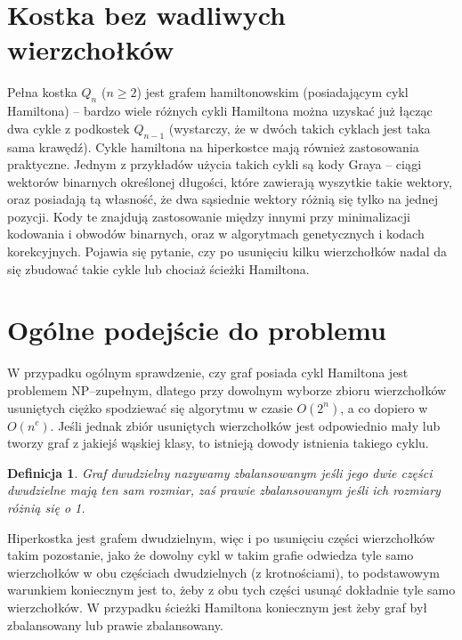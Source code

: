 \documentclass{pracamgr}
\newtheorem{defi}{Definicja}[section] %
\begin{document}
  \section{Kostka bez wadliwych wierzchołków}
   Pełna kostka $Q_n$ ($n\ge2$) jest grafem hamiltonowskim (posiadającym cykl Hamiltona)
   -- bardzo wiele różnych cykli Hamiltona można uzyskać już łącząc dwa cykle
   z podkostek $Q_{n-1}$ (wystarczy, że w dwóch takich cyklach jest taka sama krawędź).
   Cykle hamiltona na hiperkostce mają również zastosowania praktyczne. Jednym z przykładów użycia takich cykli są kody Graya
   -- ciągi wektorów binarnych określonej długości, które zawierają wyszytkie takie wektory, oraz posiadają tą własność,
   że dwa sąsiednie wektory różnią się tylko na jednej pozycji. Kody te znajdują zastosowanie między innymi przy minimalizacji kodowania i obwodów binarnych,
   oraz w algorytmach genetycznych i kodach korekcyjnych.\newline
   Pojawia się pytanie, czy po usunięciu kilku wierzchołków nadal da się zbudować takie cykle lub chociaż ścieżki Hamiltona.
  \section{Ogólne podejście do problemu}
   W przypadku ogólnym sprawdzenie, czy graf posiada cykl Hamiltona jest problemem NP--zupełnym, dlatego przy dowolnym wyborze zbioru wierzchołków usuniętych
   ciężko spodziewać się algorytmu w czasie $O(2^n)$, a co dopiero w $O(n^c)$. Jeśli jednak zbiór usuniętych wierzchołków
   jest odpowiednio mały lub tworzy graf z jakiejś wąskiej klasy, to istnieją dowody istnienia takiego cyklu.
   
   \begin{defi}\label{graf zbalansowany}
    Graf dwudzielny nazywamy \emph{zbalansowanym} jeśli jego dwie części dwudzielne mają ten sam rozmiar,
    zaś \emph{prawie zbalansowanym} jeśli ich rozmiary różnią się o 1.
   \end{defi}    
   
   Hiperkostka jest grafem dwudzielnym, więc i po usunięciu części wierzchołków takim pozostanie,
   jako że dowolny cykl w takim grafie odwiedza tyle samo wierzchołków w obu częściach dwudzielnych (z krotnościami),
   to podstawowym warunkiem koniecznym jest to, żeby z obu tych części usunąć dokładnie tyle samo wierzchołków.
   W przypadku ścieżki Hamiltona koniecznym jest żeby graf był zbalansowany lub prawie zbalansowany.
   
\end{document}
